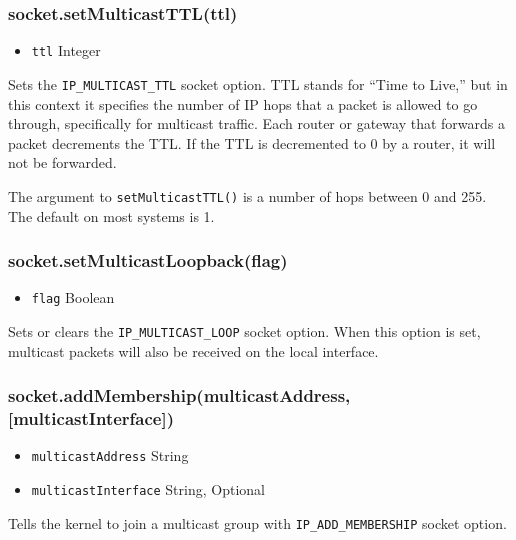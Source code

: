 \subsubsection{socket.setMulticastTTL(ttl)}\label{socket.setmulticastttlttl}

\begin{itemize}
\itemsep1pt\parskip0pt
\item
  \texttt{ttl} Integer
\end{itemize}

Sets the \texttt{IP\_MULTICAST\_TTL} socket option. TTL stands for
``Time to Live,'' but in this context it specifies the number of IP hops
that a packet is allowed to go through, specifically for multicast
traffic. Each router or gateway that forwards a packet decrements the
TTL. If the TTL is decremented to 0 by a router, it will not be
forwarded.

The argument to \texttt{setMulticastTTL()} is a number of hops between 0
and 255. The default on most systems is 1.

\subsubsection{socket.setMulticastLoopback(flag)}\label{socket.setmulticastloopbackflag}

\begin{itemize}
\itemsep1pt\parskip0pt
\item
  \texttt{flag} Boolean
\end{itemize}

Sets or clears the \texttt{IP\_MULTICAST\_LOOP} socket option. When this
option is set, multicast packets will also be received on the local
interface.

\subsubsection{socket.addMembership(multicastAddress,
{[}multicastInterface{]})}\label{socket.addmembershipmulticastaddress-multicastinterface}

\begin{itemize}
\itemsep1pt\parskip0pt
\item
  \texttt{multicastAddress} String
\item
  \texttt{multicastInterface} String, Optional
\end{itemize}

Tells the kernel to join a multicast group with
\texttt{IP\_ADD\_MEMBERSHIP} socket option.


